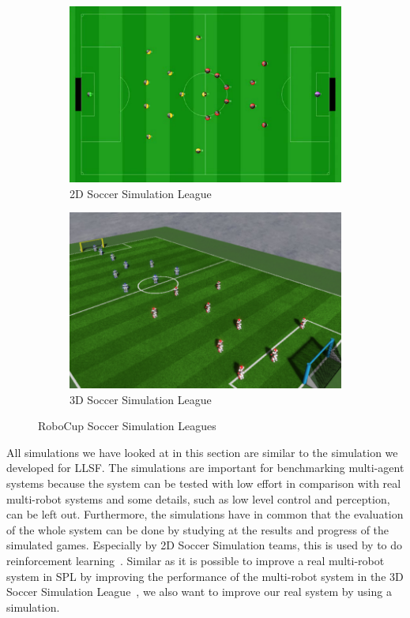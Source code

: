 \begin{figure}
  \centering
  \begin{subfigure}[b]{0.48\textwidth}
    \includegraphics[width=\textwidth]{pics/soccer_sim_2d}
    \caption{2D Soccer Simulation League~\cite{soccer_simulation_2d_pic}}
    \label{fig:soccer_simulation_2d}
  \end{subfigure}
  \begin{subfigure}[b]{0.48\textwidth}
    \includegraphics[width=\textwidth]{pics/soccer_simulation_3d}
    \caption{3D Soccer Simulation League~\cite{soccer_simulation_low_level}}
    \label{fig:soccer_simulation_3d}
  \end{subfigure}
  \caption{RoboCup Soccer Simulation Leagues}
  \label{fig:soccer_simulation}
\end{figure}
All simulations we have looked at in this section are similar to the simulation we developed for LLSF. The simulations are important for benchmarking multi-agent systems because the system can be tested with low effort in comparison with real multi-robot systems and some details, such as low level control and perception, can be left out.  Furthermore, the simulations have in common that the evaluation of the whole system can be done by studying at the results and progress of the simulated games. Especially by 2D Soccer Simulation teams, this is used by to do reinforcement learning~\cite{simsoccer_reinforcement_1,simsoccer_reinforcement_2}. Similar as it is possible to improve a real multi-robot system in SPL by improving the performance of the multi-robot system in the 3D Soccer Simulation League~\cite{from_sim_to_real}, we also want to improve our real system by using a simulation.


